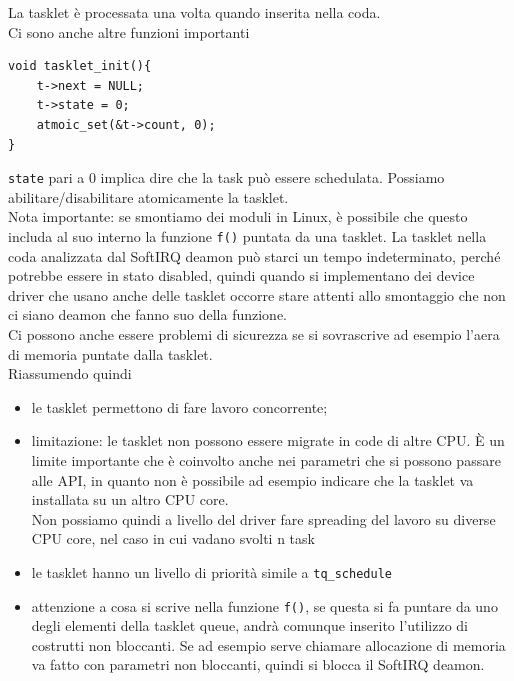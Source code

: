 \documentclass[12pt, oneside]{extbook}
\begin{document}
La tasklet è processata una volta quando inserita nella coda.\\Ci sono anche altre funzioni importanti
\begin{lstlisting}
void tasklet_init(){
	t->next = NULL;
	t->state = 0;
	atmoic_set(&t->count, 0);
}
\end{lstlisting}
\texttt{state} pari a 0 implica dire che la task può essere schedulata. Possiamo abilitare/disabilitare atomicamente la tasklet.\\Nota importante: se smontiamo dei moduli in Linux, è possibile che questo includa al suo interno la funzione \texttt{f()} puntata da una tasklet. La tasklet nella coda analizzata dal SoftIRQ deamon può starci un tempo indeterminato, perché potrebbe essere in stato disabled, quindi quando si implementano dei device driver che usano anche delle tasklet occorre stare attenti allo smontaggio che non ci siano deamon che fanno suo della funzione.\\Ci possono anche essere problemi di sicurezza se si sovrascrive ad esempio l'aera di memoria puntate dalla tasklet.\\Riassumendo quindi
\begin{itemize}
\item le tasklet permettono di fare lavoro concorrente;
\item limitazione: le tasklet non possono essere migrate in code di altre CPU. È un limite importante che è coinvolto anche nei parametri che si possono passare alle API, in quanto non è possibile ad esempio indicare che la tasklet va installata su un altro CPU core.\\Non possiamo quindi a livello del driver fare spreading del lavoro su diverse CPU core, nel caso in cui vadano svolti n task
\item le tasklet hanno un livello di priorità simile a \texttt{tq\_schedule}
\item attenzione a cosa si scrive nella funzione \texttt{f()}, se questa si fa puntare da uno degli elementi della tasklet queue, andrà comunque inserito l'utilizzo di costrutti non bloccanti. Se ad esempio serve chiamare allocazione di memoria va fatto con parametri non bloccanti, quindi si blocca il SoftIRQ deamon.
\end{itemize}
\end{document}
